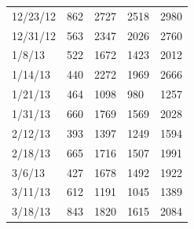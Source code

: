 \begin{landscape}
\begin{table}[htbp]
\begin{tabular}{@{}lllll@{}}
12/23/12    & 862                                    & 2727                                    & 2518                           & 2980                           \\
12/31/12    & 563                                    & 2347                                   & 2026                           & 2760                            \\
1/8/13      & 522                                    & 1672                                   & 1423                            & 2012                           \\
1/14/13     & 440                                    & 2272                                   & 1969                           & 2666                           \\
1/21/13     & 464                                    & 1098                                   & 980                            & 1257                           \\
1/31/13     & 660                                    & 1769                                   & 1569                           & 2028                           \\
2/12/13     & 393                                    & 1397                                   & 1249                           & 1594                           \\
2/18/13     & 665                                    & 1716                                   & 1507                           & 1991                           \\
3/6/13      & 427                                    & 1678                                   & 1492                           & 1922                           \\
3/11/13     & 612                                    & 1191                                    & 1045                           & 1389                           \\
3/18/13     & 843                                    & 1820                                   & 1615                           & 2084                           \\ \bottomrule
\end{tabular}
\end{table}
\end{landscape}

